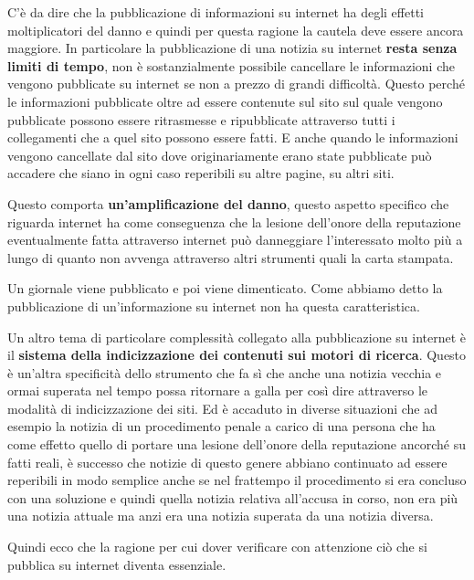  C'è da dire che la pubblicazione di informazioni su internet ha degli effetti moltiplicatori del danno e quindi per questa ragione la cautela deve essere ancora maggiore. In particolare la pubblicazione di una notizia su internet \textbf{resta senza limiti di tempo}, non è sostanzialmente possibile cancellare le informazioni che vengono pubblicate su internet se non a prezzo di grandi difficoltà. Questo perché le informazioni pubblicate oltre ad essere contenute sul sito sul quale vengono pubblicate possono essere ritrasmesse e ripubblicate attraverso tutti i collegamenti che a quel sito possono essere fatti. E anche quando le informazioni vengono cancellate dal sito dove originariamente erano state pubblicate può accadere che siano in ogni caso reperibili su altre pagine, su altri siti.\par
 Questo comporta \textbf{un'amplificazione del danno}, questo aspetto specifico che riguarda internet ha come conseguenza che la lesione dell'onore della reputazione eventualmente fatta attraverso internet può danneggiare l'interessato molto più a lungo di quanto non avvenga attraverso altri strumenti quali la carta stampata.\par
 Un giornale viene pubblicato e poi viene dimenticato. Come abbiamo detto la pubblicazione di un'informazione su internet non ha questa caratteristica.\par
 Un altro tema di particolare complessità collegato alla pubblicazione su internet è il \textbf{sistema della indicizzazione dei contenuti sui motori di ricerca}. Questo è un'altra specificità dello strumento che fa sì che anche una notizia vecchia e ormai superata nel tempo possa ritornare a galla per così dire attraverso le modalità di indicizzazione dei siti. Ed è accaduto in diverse situazioni che ad esempio la notizia di un procedimento penale a carico di una persona che ha come effetto quello di portare una lesione dell'onore della reputazione ancorché su fatti reali, è successo che notizie di questo genere abbiano continuato ad essere reperibili in modo semplice anche se nel frattempo il procedimento si era concluso con una soluzione e quindi quella notizia relativa all'accusa in corso, non era più una notizia attuale ma anzi era una notizia superata da una notizia diversa. \par
 
 Quindi ecco che la ragione per cui dover verificare con attenzione ciò che si pubblica su internet diventa essenziale.\par

